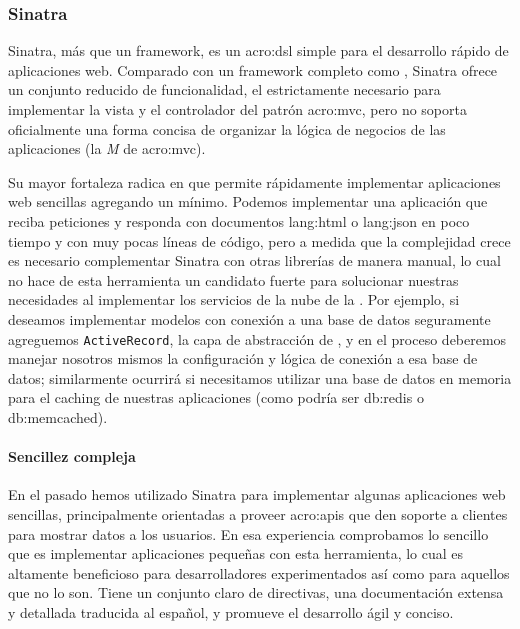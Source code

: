 \subsubsection{Sinatra}
\label{soa:tecnologias:sinatra}

Sinatra, más que un framework, es un \gls{acro:dsl} simple para el desarrollo rápido de aplicaciones web. Comparado con un framework completo como , Sinatra ofrece un conjunto reducido de funcionalidad, el estrictamente necesario para implementar la vista y el controlador del patrón \gls{acro:mvc}, pero no soporta oficialmente una forma concisa de organizar la lógica de negocios de las aplicaciones (la \textit{M} de \gls{acro:mvc}).

Su mayor fortaleza radica en que permite rápidamente implementar aplicaciones web sencillas agregando un  mínimo. Podemos implementar una aplicación que reciba peticiones y responda con documentos \gls{lang:html} o \gls{lang:json} en poco tiempo y con muy pocas líneas de código, pero a medida que la complejidad crece es necesario complementar Sinatra con otras librerías de manera manual, lo cual no hace de esta herramienta un candidato fuerte para solucionar nuestras necesidades al implementar los servicios de la nube de la {\unlp}. Por ejemplo, si deseamos implementar modelos con conexión a una base de datos seguramente agreguemos \texttt{ActiveRecord}, la capa de abstracción de , y en el proceso deberemos manejar nosotros mismos la configuración y lógica de conexión a esa base de datos; similarmente ocurrirá si necesitamos utilizar una base de datos en memoria para el caching de nuestras aplicaciones (como podría ser \gls{db:redis} o \gls{db:memcached}).

\paragraph{Sencillez compleja}

En el pasado hemos utilizado Sinatra para implementar algunas aplicaciones web sencillas, principalmente orientadas a proveer \glspl{acro:api} que den soporte a clientes para mostrar datos a los usuarios. En esa experiencia comprobamos lo sencillo que es implementar aplicaciones pequeñas con esta herramienta, lo cual es altamente beneficioso para desarrolladores experimentados así como para aquellos que no lo son. Tiene un conjunto claro de directivas, una documentación extensa y detallada traducida al español, y promueve el desarrollo ágil y conciso.

